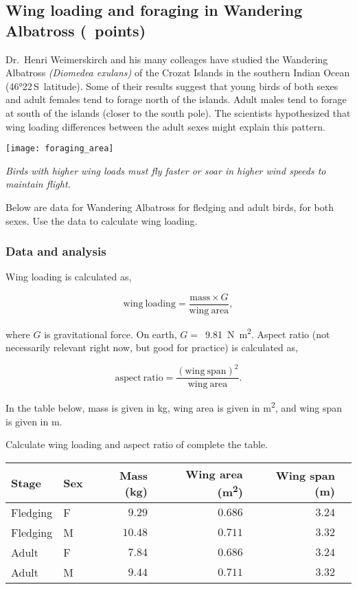 \documentclass[12pt, addpoints, hidelinks]{exam}
\begin{document}

\subsection*{Wing loading and foraging in Wandering Albatross (\numpoints\ points)}


Dr.~Henri Weimerskirch and his many colleages have studied the Wandering Albatross \textit{(Diomedea exulans)} of the Crozat Islands in the southern Indian Ocean (46°22\textprime{}\,S~latitude). Some of their results suggest that young birds of both sexes and adult females tend to forage north of the islands. Adult males tend to forage at south of the islands (closer to the south pole). The scientists hypothesized that wing loading differences between the adult sexes might explain this pattern. 

\texttt{[image: foraging\_area]}

\textit{Birds with higher wing loads must fly faster or soar in higher wind speeds to maintain flight.}

Below are data for Wandering Albatross for fledging and adult birds, for both sexes. Use the data to calculate wing loading.


\subsubsection*{Data and analysis}

Wing loading is calculated as,

\vspace{-\baselineskip}

\[ \mathrm{wing~loading} = \frac{\mathrm{mass} \times G}{\mathrm{wing~area}},\]

where $G$ is gravitational force. On earth, $G =$~\qty[mode=math]{9.81}{\newton\meter^2}. Aspect ratio (not necessarily relevant right now, but good for practice) is calculated as,

\[ \mathrm{aspect~ratio} = \frac{\mathrm{(wing~span)}^2}{\mathrm{wing~area}}.\]


In the table below, mass is given in \unit{kg}, wing area is given in \unit{\meter^2}, and wing span is given in \unit{\meter}.

Calculate wing loading and aspect ratio of complete the table.

\begin{tabular}{@{}llrrrr@{}}
\toprule
Stage & Sex & Mass (kg) & Wing area (\unit{\meter^2}) & Wing span (\unit{\meter}) \\
\midrule
Fledging	&	F	&	$9.29$ & $0.686$	&	$3.24$ & 	\\
Fledging		&	M 	&	$10.48$ &	$0.711$ &	$3.32$ & 	\\
Adult	&	F	&	$7.84$ & $0.686$	& $3.24$	& 	\\
Adult		&	M 	& $9.44$	& $0.711$	& $3.32$	& 	\\
\bottomrule
\end{tabular}
\end{document}
